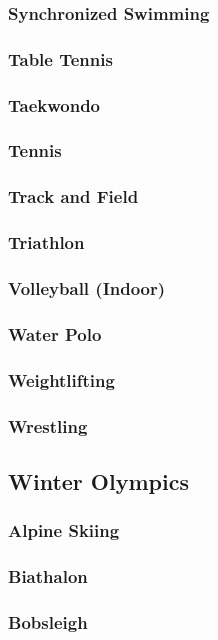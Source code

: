 			\subsubsection{Synchronized Swimming}
			\subsubsection{Table Tennis}
			\subsubsection{Taekwondo}
			\subsubsection{Tennis}
			\subsubsection{Track and Field}
			\subsubsection{Triathlon}
			\subsubsection{Volleyball (Indoor)}
			\subsubsection{Water Polo}
			\subsubsection{Weightlifting}
			\subsubsection{Wrestling}
			
			\newpage
		\subsection{Winter Olympics}
			\subsubsection{Alpine Skiing}
			\subsubsection{Biathalon}
			\subsubsection{Bobsleigh}
